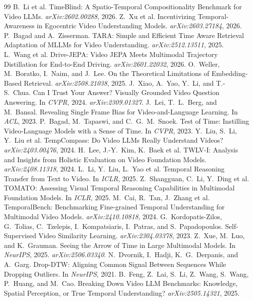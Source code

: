 \documentclass{article}
\theoremstyle{remark}
\begin{document}
\begin{thebibliography}{99}
 B.~Li et al. TimeBlind: A Spatio-Temporal Compositionality Benchmark for Video LLMs. \emph{arXiv:2602.00288}, 2026.
 Z.~Xu et al. Incentivizing Temporal-Awareness in Egocentric Video Understanding Models. \emph{arXiv:2603.27184}, 2026.
 P.~Bagad and A.~Zisserman. TARA: Simple and Efficient Time Aware Retrieval Adaptation of MLLMs for Video Understanding. \emph{arXiv:2512.13511}, 2025.
 L.~Wang et al. Drive-JEPA: Video JEPA Meets Multimodal Trajectory Distillation for End-to-End Driving. \emph{arXiv:2601.22032}, 2026.
 O.~Weller, M.~Boratko, I.~Naim, and J.~Lee. On the Theoretical Limitations of Embedding-Based Retrieval. \emph{arXiv:2508.21038}, 2025.
 J.~Xiao, A.~Yao, Y.~Li, and T.-S.~Chua. Can I Trust Your Answer? Visually Grounded Video Question Answering. In \emph{CVPR}, 2024. \emph{arXiv:2309.01327}.
 J.~Lei, T.~L.~Berg, and M.~Bansal. Revealing Single Frame Bias for Video-and-Language Learning. In \emph{ACL}, 2023.
 P.~Bagad, M.~Tapaswi, and C.~G.~M.~Snoek. Test of Time: Instilling Video-Language Models with a Sense of Time. In \emph{CVPR}, 2023.
 Y.~Liu, S.~Li, Y.~Liu et al. TempCompass: Do Video LLMs Really Understand Videos? \emph{arXiv:2403.00476}, 2024.
 H.~Lee, J.-Y.~Kim, K.~Baek et al. TWLV-I: Analysis and Insights from Holistic Evaluation on Video Foundation Models. \emph{arXiv:2408.11318}, 2024.
 L.~Li, Y.~Liu, L.~Yao et al. Temporal Reasoning Transfer from Text to Video. In \emph{ICLR}, 2025.
 Z.~Shangguan, C.~Li, Y.~Ding et al. TOMATO: Assessing Visual Temporal Reasoning Capabilities in Multimodal Foundation Models. In \emph{ICLR}, 2025.
 M.~Cai, R.~Tan, J.~Zhang et al. TemporalBench: Benchmarking Fine-grained Temporal Understanding for Multimodal Video Models. \emph{arXiv:2410.10818}, 2024.
 G.~Kordopatis-Zilos, G.~Tolias, C.~Tzelepis, I.~Kompatsiaris, I.~Patras, and S.~Papadopoulos. Self-Supervised Video Similarity Learning. \emph{arXiv:2304.03378}, 2023.
 Z.~Xue, M.~Luo, and K.~Grauman. Seeing the Arrow of Time in Large Multimodal Models. In \emph{NeurIPS}, 2025. \emph{arXiv:2506.03340}.
 N.~Dvornik, I.~Hadji, K.~G.~Derpanis, and A.~Garg. Drop-DTW: Aligning Common Signal Between Sequences While Dropping Outliers. In \emph{NeurIPS}, 2021.
 B.~Feng, Z.~Lai, S.~Li, Z.~Wang, S.~Wang, P.~Huang, and M.~Cao. Breaking Down Video LLM Benchmarks: Knowledge, Spatial Perception, or True Temporal Understanding? \emph{arXiv:2505.14321}, 2025.

\end{thebibliography}
\end{document}
